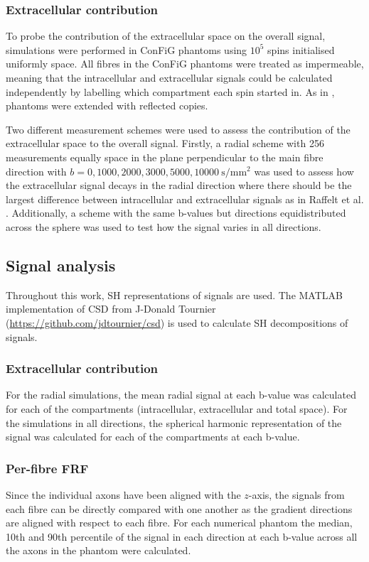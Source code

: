 \subsubsection{Extracellular contribution}
\label{sec:frf_method_extra}
To probe the contribution of the extracellular space on the overall signal, simulations were performed in \ac{ConFiG} phantoms using $10^5$ spins initialised uniformly space. All fibres in the \ac{ConFiG} phantoms were treated as impermeable, meaning that the intracellular and extracellular signals could be calculated independently by labelling which compartment each spin started in. As in , phantoms were extended with reflected copies.

Two different measurement schemes were used to assess the contribution of the extracellular space to the overall signal. Firstly, a radial scheme with 256 measurements equally space in the plane perpendicular to the main fibre direction with $b = 0, 1000, 2000, 3000, 5000, \SI{10000}{\second\per\milli\metre\squared}$ was used to assess how the extracellular signal decays in the radial direction where there should be the largest difference between intracellular and extracellular signals as in Raffelt et al. \cite{Raffelt2012}. Additionally, a scheme with the same b-values but directions equidistributed across the sphere was used to test how the signal varies in all directions.
\subsection{Signal analysis}
\label{sec:frf_signal_analysis}
Throughout this work, \ac{SH} representations of signals are used. The MATLAB implementation of \ac{CSD} from J-Donald Tournier (\url{https://github.com/jdtournier/csd}) is used to calculate \ac{SH} decompositions of signals.

\subsubsection{Extracellular contribution}
\label{sec:frf_sig_proc_extra}
For the radial simulations, the mean radial signal at each b-value was calculated for each of the compartments (intracellular, extracellular and total space). For the simulations in all directions, the spherical harmonic representation of the signal was calculated for each of the compartments at each b-value.

\subsubsection{Per-fibre \ac{FRF}}
\label{sec:frf_sig_proc_per_fibre}
Since the individual axons have been aligned with the $z$-axis, the signals from each fibre can be directly compared with one another as the gradient directions are aligned with respect to each fibre.
For each numerical phantom the median, 10th and 90th percentile of the signal in each direction at each b-value across all the axons in the phantom were calculated.


